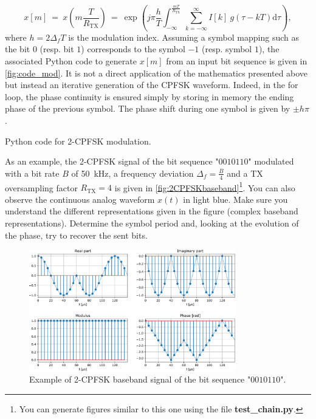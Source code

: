 \begin{equation*}
    x[m] \:=\:x\left(m\frac{T}{R_{\text{TX}}}\right)\:=\:\exp \left(j\pi \frac{h}{T} \int_{-\infty}^{\frac{mT}{R_{\text{TX}}}} \sum_{k=-\infty}^{\infty}I[k]\:g(\tau-kT) \text{d}\tau \right),
\end{equation*}
where $h=2 \Delta_f T$ is the modulation index.
Assuming a symbol mapping such as the bit $0$ (resp. bit $1$) corresponds to the symbol $-1$ (resp. symbol $1$), the associated Python code to generate $x[m]$ from an input bit sequence is given in \autoref{fig:code_mod}. It is not a direct application of the mathematics presented above but instead an iterative generation of the CPFSK waveform. Indeed, in the for loop, the phase continuity is ensured simply by storing in memory the ending phase of the previous symbol. The phase shift during one symbol is given by $\pm h\pi$.

\begin{listing}[H]
\caption{Python code for 2-CPFSK modulation.}
\label{fig:code_mod}
\end{listing}



As an example, the 2-CPFSK signal of the bit sequence "$0010110$" modulated with a bit rate $B$ of \SI{50}{\kilo\hertz}, a frequency deviation $\Delta_f=\frac{B}{4}$ and a TX oversampling factor $R_{\text{TX}}=4$ is given in \autoref{fig:2CPFSKbaseband}\footnote{You can generate figures similar to this one using the file \textbf{test_chain.py}.}. You can also observe the continuous analog waveform $x(t)$ in light blue. Make sure you understand the different representations given in the figure (complex baseband representations). Determine the symbol period and, looking at the evolution of the phase, try to recover the sent bits.

\begin{figure}[h]
    \centering
    \includegraphics[width=0.8\textwidth]{figures/2-cpfsk-bis.pdf}
    \caption{Example of 2-CPFSK baseband signal of the bit sequence "$0010110$".}
    \label{fig:2CPFSKbaseband}
\end{figure}


